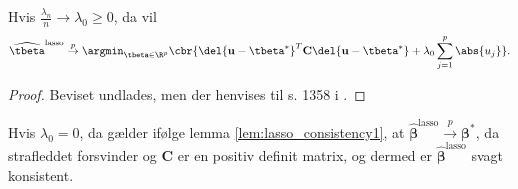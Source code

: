 \begin{lem}\label{lem:lasso_consistency1}
Hvis $\frac{\lambda_n}{n} \rightarrow \lambda_0 \geq 0$, da vil
\begin{align*}
\widehat{\tbeta}^\text{lasso} \overset{p}{\rightarrow} \argmin_{\tbeta \in \R^p} \cbr{ \del{\mathbf{u} - \tbeta^*}^T \mathbf{C} \del{\mathbf{u} - \tbeta^*} + \lambda_0 \sum_{j=1}^p \abs{ u_j }}.
\end{align*}
\end{lem}
\begin{proof}
Beviset undlades, men der henvises til s. 1358 i \citep{adaptive_lasso_knight}.
\end{proof}
Hvis $\lambda_0=0$, da gælder ifølge lemma \ref{lem:lasso_consistency1}, at $\widehat{\boldsymbol{\beta}}^\text{lasso} \overset{p}{\rightarrow} \boldsymbol{\beta}^{*}$, da strafleddet forsvinder og $\mathbf{C}$ er en positiv definit matrix, og dermed er $\widehat{\boldsymbol{\beta}}^\text{lasso}$ svagt konsistent. 

